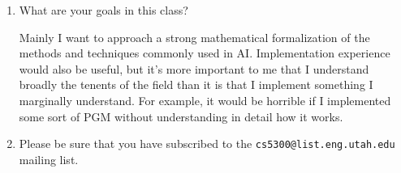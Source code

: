 \documentclass[12pt]{article}
\begin{document}
\begin{enumerate}
\item What are your goals in this class?

\begin{solution}
Mainly I want to approach a strong mathematical formalization of the methods and techniques commonly used in AI. Implementation experience would also be useful, but it's more important to me that I understand broadly the tenents of the field than it is that I implement something I marginally understand. For example, it would be horrible if I implemented some sort of PGM without understanding in detail how it works.
\end{solution}

\item Please be sure that you have subscribed to the
\verb+cs5300@list.eng.utah.edu+ mailing list.

\end{enumerate}
\end{document}
